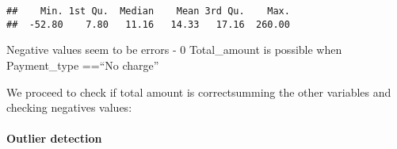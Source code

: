 \documentclass[
  18pt,
  a4paper]{article}
\newenvironment{Shaded}{\begin{snugshade}}{\end{snugshade}}
\newcommand{\CommentTok}[1]{\textcolor[rgb]{0.56,0.35,0.01}{\textit{#1}}}
\newcommand{\ControlFlowTok}[1]{\textcolor[rgb]{0.13,0.29,0.53}{\textbf{#1}}}
\newcommand{\DecValTok}[1]{\textcolor[rgb]{0.00,0.00,0.81}{#1}}
\newcommand{\KeywordTok}[1]{\textcolor[rgb]{0.13,0.29,0.53}{\textbf{#1}}}
\newcommand{\NormalTok}[1]{#1}
\newcommand{\OperatorTok}[1]{\textcolor[rgb]{0.81,0.36,0.00}{\textbf{#1}}}
\newcommand{\OtherTok}[1]{\textcolor[rgb]{0.56,0.35,0.01}{#1}}
\newcommand{\StringTok}[1]{\textcolor[rgb]{0.31,0.60,0.02}{#1}}
\begin{document}
\begin{verbatim}
##    Min. 1st Qu.  Median    Mean 3rd Qu.    Max. 
##  -52.80    7.80   11.16   14.33   17.16  260.00
\end{verbatim}

Negative values seem to be errors - 0 Total\_amount is possible when
Payment\_type ==``No charge''

We proceed to check if total amount is correctsumming the other
variables and checking negatives values:

\begin{Shaded}
\end{Shaded}

\hypertarget{outlier-detection-4}{%
\paragraph{Outlier detection}\label{outlier-detection-4}}

\begin{Shaded}
\end{Shaded}
\end{document}
